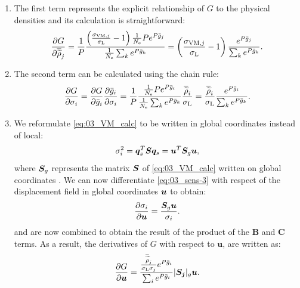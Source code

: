 \begin{enumerate}[label=\Alph* --]
    \item The first term represents the explicit relationship of $G$ to the physical densities and its calculation is straightforward: 
    \begin{equation} \label{eq:03_sens-2-1}
        \frac{\partial G}{\partial \overline{\widetilde{\rho}}_j} = \frac{1}{P} \frac{\left(\frac{ \sigma_{\text{VM},j}}{\sigma_\text{L}}-1 \right)\frac{1}{N_\text{e}} P e^{{P}\bar{g}_j}}{\frac{1}{N_\text{e}} \sum_k e^{{P}\bar{g}_k}} = \left(\frac{ \sigma_{\text{VM},j}}{\sigma_\text{L}}-1 \right) \frac{e^{{P}\bar{g}_j}}{\sum_k e^{{P}\bar{g}_k}}.
    \end{equation}
    
    \item The second term can be calculated using the chain rule:
    \begin{equation}
        \label{eq:03_sens-2-2}
        \frac{\partial G}{\partial\sigma_i} = \frac{\partial G}{\partial\bar{g}_i} \frac{\partial\bar{g}_i}{\partial\sigma_i} = \frac{1}{P} \frac{\frac{1}{N_\text{e}} P e^{{P}\bar{g}_i}}{\frac{1}{N_\text{e}} \sum_k e^{{P}\bar{g}_k}} \frac{\overline{\widetilde{\rho}}_i}{\sigma_\text{L}} = \frac{\overline{\widetilde{\rho}}_i}{\sigma_\text{L}} \frac{e^{{P}\bar{g}_i}}{\sum_k e^{{P}\bar{g}_k}}.
    \end{equation}
    
    \item We reformulate \eqref{eq:03_VM_calc} to be written in global coordinates instead of local:
    \begin{equation}
        \label{eq:03_sens-3}
        \sigma_i^2 = \bm{q}_s^T\bm{S}\bm{q}_s = \bm{u}^T \bm{S}_g \bm{u},
    \end{equation}  
    where $\bm{S}_g$ represents the matrix $\bm{S}$ of \eqref{eq:03_VM_calc} written on global coordinates . We can now differentiate \eqref{eq:03_sens-3} with respect of the displacement field in global coordinates $\bm{u}$ to obtain:
    \begin{equation}
        \label{eq:03_sens-4}
        \frac{\partial\sigma_i}{\partial\bm{u}} = \frac{\bm{S}_g \bm{u}}{\sigma_i}.
    \end{equation}
     and  are now combined to obtain the result of the product of the \textbf{B} and \textbf{C} terms. As a result, the derivatives of $G$ with respect to $\bm{u}$, are written as:
    \begin{equation} \label{eq:03_sens-4-1}
        \frac{\partial G}{\partial\bm{u}} = \frac{\frac{\overline{\widetilde{\rho}}_j}{\sigma_\text{L}\sigma_j} e^{{P}\bar{g}_i}}{\sum_i e^{{P}\bar{g}_i}} |\bm{S_j}|_g \bm{u}.
    \end{equation}


\end{enumerate}
